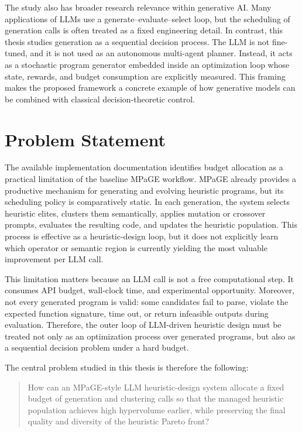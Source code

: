 The study also has broader research relevance within generative AI. Many applications of LLMs use a generate--evaluate--select loop, but the scheduling of generation calls is often treated as a fixed engineering detail. In contrast, this thesis studies generation as a sequential decision process. The LLM is not fine-tuned, and it is not used as an autonomous multi-agent planner. Instead, it acts as a stochastic program generator embedded inside an optimization loop whose state, rewards, and budget consumption are explicitly measured. This framing makes the proposed framework a concrete example of how generative models can be combined with classical decision-theoretic control.

\section{Problem Statement}

The available implementation documentation identifies budget allocation as a practical limitation of the baseline MPaGE workflow. MPaGE already provides a productive mechanism for generating and evolving heuristic programs, but its scheduling policy is comparatively static. In each generation, the system selects heuristic elites, clusters them semantically, applies mutation or crossover prompts, evaluates the resulting code, and updates the heuristic population. This process is effective as a heuristic-design loop, but it does not explicitly learn which operator or semantic region is currently yielding the most valuable improvement per LLM call.

This limitation matters because an LLM call is not a free computational step. It consumes API budget, wall-clock time, and experimental opportunity. Moreover, not every generated program is valid: some candidates fail to parse, violate the expected function signature, time out, or return infeasible outputs during evaluation. Therefore, the outer loop of LLM-driven heuristic design must be treated not only as an optimization process over generated programs, but also as a sequential decision problem under a hard budget.

The central problem studied in this thesis is therefore the following:

\begin{quote}
How can an MPaGE-style LLM heuristic-design system allocate a fixed budget of generation and clustering calls so that the managed heuristic population achieves high hypervolume earlier, while preserving the final quality and diversity of the heuristic Pareto front?
\end{quote}

